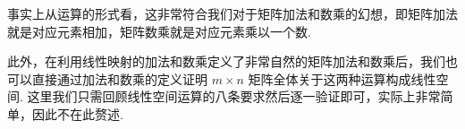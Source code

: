 
事实上从运算的形式看，这非常符合我们对于矩阵加法和数乘的幻想，即矩阵加法就是对应元素相加，矩阵数乘就是对应元素乘以一个数.

此外，在利用线性映射的加法和数乘定义了非常自然的矩阵加法和数乘后，我们也可以直接通过加法和数乘的定义证明 $m\times n$ 矩阵全体关于这两种运算构成线性空间. 这里我们只需回顾线性空间运算的八条要求然后逐一验证即可，实际上非常简单，因此不在此赘述.


